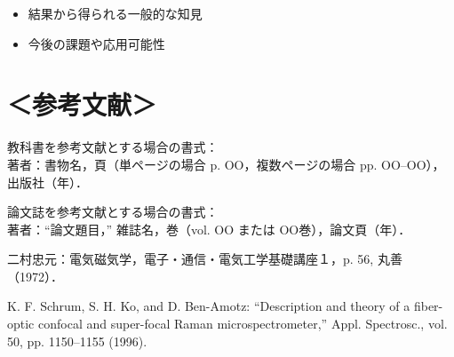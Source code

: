 \documentclass[lualatex,ja=standard]{bxjsarticle}
\begin{document}
\begin{itemize}
  \item 結果から得られる一般的な知見
  \item 今後の課題や応用可能性
\end{itemize}

\section*{＜参考文献＞}

\begin{enumerate}[label={[\arabic*]}]
  \item 教科書を参考文献とする場合の書式：\\
  著者：書物名，頁（単ページの場合 p. OO，複数ページの場合 pp. OO--OO），出版社（年）．

  \item 論文誌を参考文献とする場合の書式：\\
  著者：“論文題目，” 雑誌名，巻（vol. OO または OO巻），論文頁（年）．

  \item 二村忠元：電気磁気学，電子・通信・電気工学基礎講座１，p. 56, 丸善（1972）．

  \item K. F. Schrum, S. H. Ko, and D. Ben-Amotz: “Description and theory of a fiber-optic confocal and super-focal Raman microspectrometer,” Appl. Spectrosc., vol. 50, pp. 1150–1155 (1996).
\end{enumerate}
\end{document}
